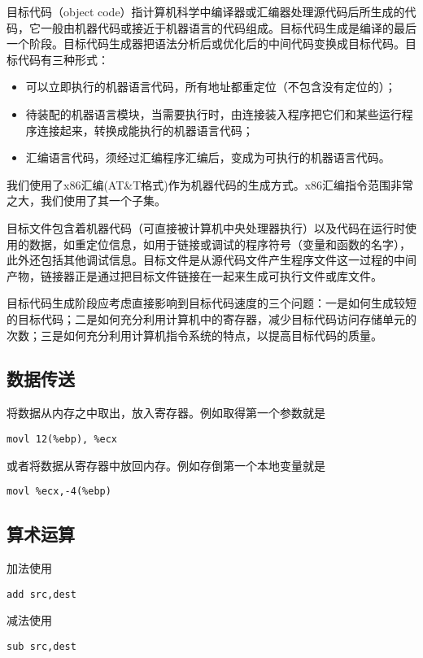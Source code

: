 ﻿\documentclass{article}
\begin{document}
目标代码（object code）指计算机科学中编译器或汇编器处理源代码后所生成的代码，它一般由机器代码或接近于机器语言的代码组成。目标代码生成是编译的最后一个阶段。目标代码生成器把语法分析后或优化后的中间代码变换成目标代码。目标代码有三种形式：

\begin{itemize}
\item 可以立即执行的机器语言代码，所有地址都重定位（不包含没有定位的）；
\item 待装配的机器语言模块，当需要执行时，由连接装入程序把它们和某些运行程序连接起来，转换成能执行的机器语言代码；
\item 汇编语言代码，须经过汇编程序汇编后，变成为可执行的机器语言代码。
\end{itemize}

我们使用了x86汇编(AT\&T格式)作为机器代码的生成方式。x86汇编指令范围非常之大，我们使用了其一个子集。

目标文件包含着机器代码（可直接被计算机中央处理器执行）以及代码在运行时使用的数据，如重定位信息，如用于链接或调试的程序符号（变量和函数的名字），此外还包括其他调试信息。目标文件是从源代码文件产生程序文件这一过程的中间产物，链接器正是通过把目标文件链接在一起来生成可执行文件或库文件。

目标代码生成阶段应考虑直接影响到目标代码速度的三个问题：一是如何生成较短的目标代码；二是如何充分利用计算机中的寄存器，减少目标代码访问存储单元的次数；三是如何充分利用计算机指令系统的特点，以提高目标代码的质量。

\subsection{数据传送}
将数据从内存之中取出，放入寄存器。例如取得第一个参数就是
\begin{lstlisting}
movl 12(%ebp), %ecx
\end{lstlisting}

或者将数据从寄存器中放回内存。例如存倒第一个本地变量就是
\begin{lstlisting}
movl %ecx,-4(%ebp)
\end{lstlisting}

\subsection{算术运算}

加法使用
\begin{lstlisting}
add src,dest
\end{lstlisting}

减法使用
\begin{lstlisting}
sub src,dest
\end{lstlisting}
\end{document}
